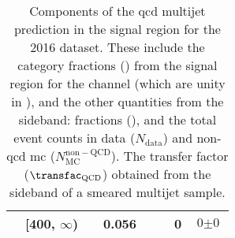 \begin{table}[htbp]
\begin{tabular*}{\linewidth}{@{\extracolsep{\fill}}llclcccr}
& [400, $\infty$) & & 0.056 & & & 0 & $\text{0} \pm \text{0}$ \\
\bottomrule
\end{tabular*}
\caption[Components of the \acrshort{qcd} multijet prediction in the signal region for the 2016 dataset]{Components of the \acrshort{qcd} multijet prediction in the signal region for the 2016 dataset. These include the category fractions (\catFraction) from the signal region for the \ttH channel (which are unity in \VH), and the other quantities from the sideband: \ptmiss fractions (\metFraction), and the total event counts in data ($N_{\mathrm{data}}$) and non-\acrshort{qcd} \acrshort{mc} ($N_{\mathrm{MC}}^{\mathrm{non-QCD}}$). The transfer factor ($\transfac_{\mathrm{QCD}}$) obtained from the sideband of a smeared multijet sample.}
\label{tab:htoinv_qcd_pred_2016}
\end{table}


